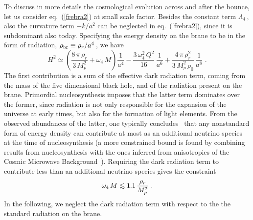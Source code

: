 \documentclass[a4paper,11pt]{article}
\def\la{\mathrel{\raise.3ex\hbox{$<$\kern-.75em\lower1ex\hbox{$\sim$}}}}
\begin{document}
To discuss in more details the cosmological evolution across and after the
bounce, let us consider eq.~(\ref{frebra2}) at small scale factor. Besides
the constant term $\Lambda_4\,$, also the curvature term  $-k/a^2$ can be
neglected in eq.~(\ref{frebra2}), since it is subdominant also today.
Specifying the energy density on the brane to be in the form of radiation,
$\rho_{\rm br} \equiv \rho_r/a^4\,$, we have
%
\begin{equation}
H^2 \simeq \left( \frac{8\,\pi\,\rho_r}{3\,M_p^2} + \omega_4 \, M \right) \frac{1}{a^4} - \frac{3\,\omega_4^2\,Q^2}{16} \, \frac{1}{a^6} + \frac{4\,\pi \, \rho_r^2}{3\,M_p^2\,\rho_0} \, \frac{1}{a^8} \,\,. 
\label{frebra3}
\end{equation}
%
The first contribution is a sum of the effective dark radiation term,
coming from the mass of the five dimensional black hole, and of the
radiation present on the brane. Primordial nucleosynthesis imposes that
the latter term dominates over the former, since radiation is not only
responsible for the expansion of the universe at early times, but also for
the formation of light elements. From the observed abundances of the
latter, one typically concludes~\cite{LSV,OSW} that any nonstandard form
of energy density can contribute at most as an additional neutrino species
at the time of nucleosynthesis (a more constrained bound is found by
combining results from nucleosynthesis with the ones inferred from
anisotropies of the Cosmic Microwave Background~\cite{HMMMP}). Requiring
the dark radiation term to contribute less than an additional neutrino
species gives the constraint
%
\begin{equation}
\omega_4 \, M \la 1.1 \, \frac{\rho_r}{M_p^2} \,\,.
\label{dis1}
\end{equation}
%
In the following, we neglect the dark radiation term with respect to the the standard radiation on the brane.
\end{document}
